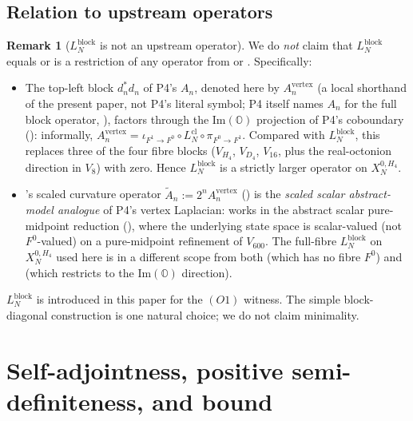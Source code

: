 \documentclass[11pt]{article}
\newcommand{\OO}{\mathbb{O}}
\theoremstyle{definition}
\newtheorem{remark}[theorem]{Remark}
\begin{document}
\subsection{Relation to upstream operators}

\begin{remark}[$L_N^{\mathrm{block}}$ is not an upstream operator]
\label{rmk:no-identification}
We do \emph{not} claim that $L_N^{\mathrm{block}}$ equals or is a
restriction of any operator from \cite{ClosureDynamics} or
\cite{RefinementCompat}. Specifically:
\begin{itemize}
\item The top-left block $d_n^{*} d_n$ of P4's
  $A_n$, denoted here by $A_n^{\mathrm{vertex}}$ (a local
  shorthand of the present paper, not P4's literal symbol;
  P4 itself names $A_n$ for the full block operator,
  \cite[Definition~\texttt{def:An}]{ClosureDynamics}), factors
  through the $\mathrm{Im}(\OO)$ projection of P4's coboundary
  (\cite[Definition~\texttt{def:coboundary}]{ClosureDynamics}):
  informally,
  $A_n^{\mathrm{vertex}} = \iota_{F^1 \to F^0} \circ
  L^{\mathrm{cl}}_N \circ \pi_{F^0 \to F^1}$. Compared with
  $L_N^{\mathrm{block}}$, this replaces three of the four fibre
  blocks ($V_{H_4}$, $V_{D_4}$, $V_{16}$, plus the real-octonion
  direction in $V_8$) with zero. Hence $L_N^{\mathrm{block}}$ is
  a strictly larger operator on $X_N^{0, H_4}$.
\item \cite{RefinementCompat}'s scaled curvature operator
  $\widetilde A_n := 2^n A_n^{\mathrm{vertex}}$
  (\cite[Definition~\texttt{def:Atilde}]{RefinementCompat}) is
  the \emph{scaled scalar abstract-model analogue} of P4's
  vertex Laplacian: \cite{RefinementCompat} works in the
  abstract scalar pure-midpoint reduction
  (\cite[Definition~\texttt{def:abstract-model}]{RefinementCompat}),
  where the underlying state space is scalar-valued (not
  $F^0$-valued) on a pure-midpoint refinement of $V_{600}$. The
  full-fibre $L_N^{\mathrm{block}}$ on $X_N^{0, H_4}$ used here
  is in a different scope from both
  \cite{RefinementCompat} (which has no fibre $F^0$) and
  \cite{ClosureDynamics} (which restricts to the
  $\mathrm{Im}(\OO)$ direction).
\end{itemize}
$L_N^{\mathrm{block}}$ is introduced in this paper for the
$(O1)$ witness. The simple block-diagonal construction is one
natural choice; we do not claim minimality.
\end{remark}

\section{Self-adjointness, positive semi-definiteness, and bound}
\label{sec:psd}
\end{document}
